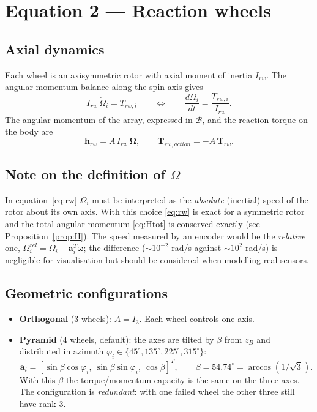 \documentclass[11pt,a4paper]{article}
\newcommand{\vect}[1]{\bm{#1}}
\newcommand{\w}{\vect{\omega}}
\newcommand{\h}{\vect{h}_{rw}}
\newcommand{\T}{\vect{T}}
\begin{document}
\section{Equation 2 --- Reaction wheels}\label{sec:wheels}

\subsection{Axial dynamics}
Each wheel is an axisymmetric rotor with axial moment of inertia
$I_{rw}$. The angular momentum balance along the spin axis gives
\begin{equation}
  I_{rw}\,\dot\Omega_i = T_{rw,i}
  \qquad\Longleftrightarrow\qquad
  \frac{d\Omega_i}{dt} = \frac{T_{rw,i}}{I_{rw}}.
  \label{eq:rw}
\end{equation}
The angular momentum of the array, expressed in $\mathcal{B}$, and the reaction
torque on the body are
\begin{equation}
  \h = A\,I_{rw}\,\vect\Omega,
  \qquad
  \T_{rw,action} = -A\,\vect{T}_{rw}.
  \label{eq:hrw}
\end{equation}

\subsection{Note on the definition of $\Omega$}\label{sec:wheels-note}
In equation~\eqref{eq:rw} $\Omega_i$ must be interpreted as the \emph{absolute}
(inertial) speed of the rotor about its own axis. With this choice
\eqref{eq:rw} is exact for a symmetric rotor and the total angular momentum
\eqref{eq:Htot} is conserved exactly (see
Proposition~\ref{prop:H}). The speed measured by an encoder would be the
\emph{relative} one, $\Omega_i^{rel} = \Omega_i - \vect a_i^T\w$; the difference
($\sim10^{-2}$ rad/s against $\sim10^2$ rad/s) is negligible for
visualisation but should be considered when modelling real sensors.

\subsection{Geometric configurations}
\begin{itemize}
  \item \textbf{Orthogonal} (3 wheels): $A = I_3$. Each wheel controls one axis.
  \item \textbf{Pyramid} (4 wheels, default): the axes are tilted by
        $\beta$ from $z_B$ and distributed in azimuth
        $\varphi_i\in\{45^\circ,135^\circ,225^\circ,315^\circ\}$:
        \begin{equation}
          \vect a_i = [\sin\beta\cos\varphi_i,\ \sin\beta\sin\varphi_i,\ \cos\beta]^T,
          \qquad \beta = 54.74^\circ = \arccos(1/\sqrt3).
        \end{equation}
        With this $\beta$ the torque/momentum capacity is the same on the three
        axes. The configuration is \emph{redundant}: with one failed wheel the
        other three still have rank 3.
\end{itemize}
\end{document}
